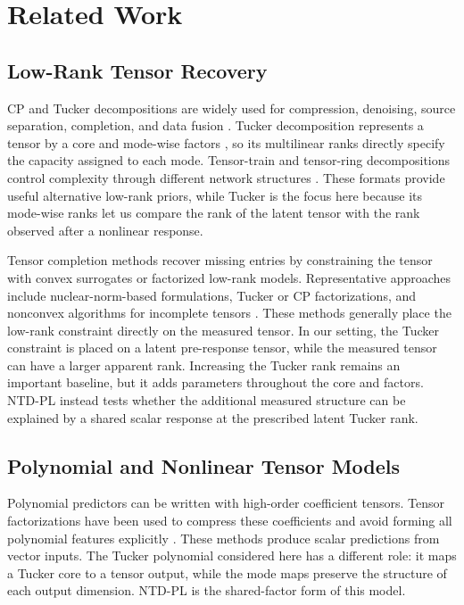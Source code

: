 \section{Related Work}
\label{sec:related_work}

\subsection{Low-Rank Tensor Recovery}

CP and Tucker decompositions are widely used for compression, denoising,
source separation, completion, and data fusion
\cite{Kolda2009Tensor,Cichocki2015SignalProcessing,Sidiropoulos2017TSP}.
Tucker decomposition represents a tensor by a core and mode-wise factors
\cite{DeLathauwer2000MLSVD}, so its multilinear ranks directly specify the
capacity assigned to each mode. Tensor-train and tensor-ring decompositions
control complexity through different network structures
\cite{oseledets2011,zhao2016tr}. These formats provide useful alternative
low-rank priors, while Tucker is the focus here because its mode-wise ranks let
us compare the rank of the latent tensor with the rank observed after a
nonlinear response.

Tensor completion methods recover missing entries by constraining the tensor
with convex surrogates or factorized low-rank models. Representative approaches
include nuclear-norm-based formulations, Tucker or CP factorizations, and
nonconvex algorithms for incomplete tensors
\cite{Liu2013TensorCompletion,LiuMoitra2020TensorCompletion,yang2016iterative}.
These methods generally place the low-rank constraint directly on the measured
tensor. In our setting, the Tucker constraint is placed on a latent
pre-response tensor, while the measured tensor can have a larger apparent
rank. Increasing the Tucker rank remains an important baseline, but it adds
parameters throughout the core and factors. NTD-PL instead tests whether the
additional measured structure can be explained by a shared scalar response at
the prescribed latent Tucker rank.

\subsection{Polynomial and Nonlinear Tensor Models}

Polynomial predictors can be written with high-order coefficient tensors.
Tensor factorizations have been used to compress these coefficients and avoid
forming all polynomial features explicitly
\cite{yang2015tensorMachines,novikov2016exponentialMachines}. These methods
produce scalar predictions from vector inputs. The Tucker polynomial considered
here has a different role: it maps a Tucker core to a tensor output, while the
mode maps preserve the structure of each output dimension. NTD-PL is the
shared-factor form of this model.

